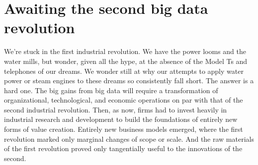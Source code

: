 \documentclass[12pt]{article}
\begin{document}






\section{Awaiting the second big data revolution}
\label{sec:awaiting-big-data}

We're stuck in the first industrial revolution. We have the power
looms and the water mills, but wonder, given all the hype, at the
absence of the Model Ts and telephones of our dreams. We wonder still
at why our attempts to apply water power or steam engines to these
dreams so consistently fall short. The answer is a hard one. The big
gains from big data will require a transformation of organizational,
technological, and economic operations on par with that of the second
industrial revolution. Then, as now, firms had to invest heavily in
industrial research and development to build the foundations of
entirely new forms of value creation. Entirely new business models
emerged, where the first revolution marked only marginal changes of
scope or scale. And the raw materials of the first revolution proved
only tangentially useful to the innovations of the second. 
\end{document}
